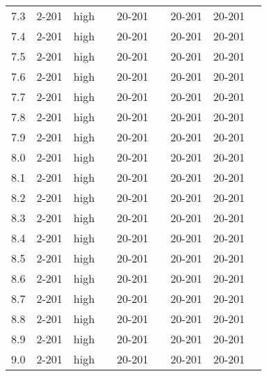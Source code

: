 \documentclass{article}
\begin{document}
\begin{center}
\begin{tabular}{| c | c | c | c | c | c | c | c | c |}
      7.3 & 2-201 & high &  & 20-201 &  & 20-201 & 20-201 &\\
      7.4 & 2-201 & high &  & 20-201 &  & 20-201 & 20-201 &\\
      7.5 & 2-201 & high &  & 20-201 &  & 20-201 & 20-201 &\\
      7.6 & 2-201 & high &  & 20-201 &  & 20-201 & 20-201 &\\
      7.7 & 2-201 & high &  & 20-201 &  & 20-201 & 20-201 &\\
      7.8 & 2-201 & high &  & 20-201 &  & 20-201 & 20-201 &\\
      7.9 & 2-201 & high &  & 20-201 &  & 20-201 & 20-201 &\\
      8.0 & 2-201 & high &  & 20-201 &  & 20-201 & 20-201 &\\
      8.1 & 2-201 & high &  & 20-201 &  & 20-201 & 20-201 &\\
      8.2 & 2-201 & high &  & 20-201 &  & 20-201 & 20-201 &\\
      8.3 & 2-201 & high &  & 20-201 &  & 20-201 & 20-201 &\\
      8.4 & 2-201 & high &  & 20-201 &  & 20-201 & 20-201 &\\
      8.5 & 2-201 & high &  & 20-201 &  & 20-201 & 20-201 &\\
      8.6 & 2-201 & high &  & 20-201 &  & 20-201 & 20-201 &\\
      8.7 & 2-201 & high &  & 20-201 &  & 20-201 & 20-201 &\\
      8.8 & 2-201 & high &  & 20-201 &  & 20-201 & 20-201 &\\
      8.9 & 2-201 & high &  & 20-201 &  & 20-201 & 20-201 &\\
      9.0 & 2-201 & high &  & 20-201 &  & 20-201 & 20-201 &\\
      \hline
    \end{tabular}

\end{center}
\end{document}
